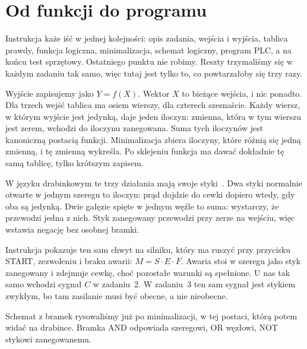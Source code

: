 \newpage
\section{Od funkcji do programu}

Instrukcja każe iść w jednej kolejności: opis zadania, wejścia i wyjścia, tablica prawdy, funkcja logiczna, minimalizacja, schemat logiczny, program PLC, a na końcu test sprzętowy. Ostatniego punktu nie robimy. Reszty trzymaliśmy się w każdym zadaniu tak samo, więc tutaj jest tylko to, co powtarzałoby się trzy razy.

Wyjście zapisujemy jako $Y = f(X)$. Wektor $X$ to bieżące wejścia, i nic ponadto. Dla trzech wejść tablica ma osiem wierszy, dla czterech szesnaście. Każdy wiersz, w którym wyjście jest jedynką, daje jeden iloczyn: zmienna, która w tym wierszu jest zerem, wchodzi do iloczynu zanegowana. Suma tych iloczynów jest kanoniczną postacią funkcji. Minimalizacja zbiera iloczyny, które różnią się jedną zmienną, i tę zmienną wykreśla. Po sklejeniu funkcja ma dawać dokładnie tę samą tablicę, tylko krótszym zapisem.

W języku drabinkowym te trzy działania mają swoje styki~\cite{flaga,legierski}. Dwa styki normalnie otwarte w jednym szeregu to iloczyn: prąd dojdzie do cewki dopiero wtedy, gdy oba są jedynką. Dwie gałęzie spięte w jednym węźle to suma: wystarczy, że przewodzi jedna z nich. Styk zanegowany przewodzi przy zerze na wejściu, więc wstawia negację bez osobnej bramki.

Instrukcja pokazuje ten sam chwyt na silniku, który ma ruszyć przy przycisku START, zezwoleniu i braku awarii: $M = S \cdot E \cdot \overline{F}$. Awaria stoi w szeregu jako styk zanegowany i zdejmuje cewkę, choć pozostałe warunki są spełnione. U nas tak samo wchodzi sygnał $C$ w zadaniu~2. W zadaniu~3 ten sam sygnał jest stykiem zwykłym, bo tam zasilanie musi być obecne, a nie nieobecne.

Schemat z bramek rysowaliśmy już po minimalizacji, w tej postaci, którą potem widać na drabince. Bramka AND odpowiada szeregowi, OR węzłowi, NOT stykowi zanegowanemu.
